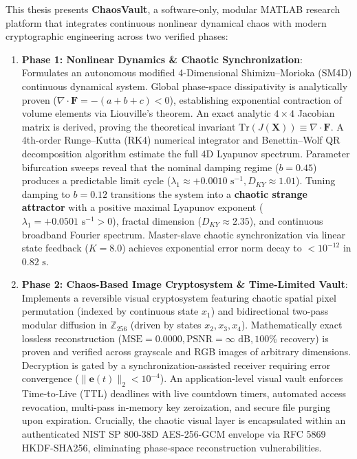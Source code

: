 \documentclass[12pt,a4paper,oneside]{report}
\begin{document}
This thesis presents \textbf{ChaosVault}, a software-only, modular MATLAB research platform that integrates continuous nonlinear dynamical chaos with modern cryptographic engineering across two verified phases:
\begin{enumerate}
    \item \textbf{Phase 1: Nonlinear Dynamics \& Chaotic Synchronization}: Formulates an autonomous modified 4-Dimensional Shimizu--Morioka (SM4D) continuous dynamical system. Global phase-space dissipativity is analytically proven ($\nabla \cdot \mathbf{F} = -(a+b+c) < 0$), establishing exponential contraction of volume elements via Liouville's theorem. An exact analytic $4 \times 4$ Jacobian matrix is derived, proving the theoretical invariant $\text{Tr}(J(\mathbf{X})) \equiv \nabla \cdot \mathbf{F}$. A 4th-order Runge--Kutta (RK4) numerical integrator and Benettin--Wolf QR decomposition algorithm estimate the full 4D Lyapunov spectrum. Parameter bifurcation sweeps reveal that the nominal damping regime ($b=0.45$) produces a predictable limit cycle ($\lambda_1 \approx +0.0010\text{ s}^{-1}, D_{KY} \approx 1.01$). Tuning damping to $b=0.12$ transitions the system into a \textbf{chaotic strange attractor} with a positive maximal Lyapunov exponent ($\lambda_1 = +0.0501\text{ s}^{-1} > 0$), fractal dimension ($D_{KY} \approx 2.35$), and continuous broadband Fourier spectrum. Master-slave chaotic synchronization via linear state feedback ($K=8.0$) achieves exponential error norm decay to $< 10^{-12}$ in $0.82\text{ s}$.
    \item \textbf{Phase 2: Chaos-Based Image Cryptosystem \& Time-Limited Vault}: Implements a reversible visual cryptosystem featuring chaotic spatial pixel permutation (indexed by continuous state $x_1$) and bidirectional two-pass modular diffusion in $\mathbb{Z}_{256}$ (driven by states $x_2, x_3, x_4$). Mathematically exact lossless reconstruction ($\text{MSE} = 0.0000, \text{PSNR} = \infty\text{ dB}, 100\%$ recovery) is proven and verified across grayscale and RGB images of arbitrary dimensions. Decryption is gated by a synchronization-assisted receiver requiring error convergence ($\|\mathbf{e}(t)\|_2 < 10^{-4}$). An application-level visual vault enforces Time-to-Live (TTL) deadlines with live countdown timers, automated access revocation, multi-pass in-memory key zeroization, and secure file purging upon expiration. Crucially, the chaotic visual layer is encapsulated within an authenticated NIST SP 800-38D AES-256-GCM envelope via RFC 5869 HKDF-SHA256, eliminating phase-space reconstruction vulnerabilities.
\end{enumerate}
\end{document}
